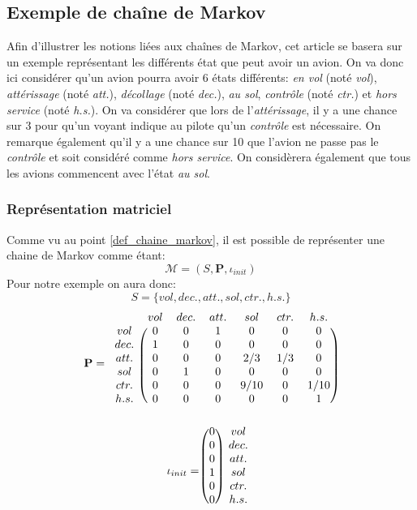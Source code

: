 \documentclass[letterpaper]{article}
\begin{document}
  \subsection{Exemple de chaîne de Markov}
    \label{exemple}
    Afin d'illustrer les notions liées aux chaînes de Markov, cet article se 
    basera sur un exemple représentant les différents état que peut avoir 
    un avion.  On va donc ici considérer qu'un avion pourra avoir 6 états 
    différents: \textit{en vol} (noté \textit{vol}), \textit{attérissage} 
    (noté \textit{att.}), \textit{décollage} (noté \textit{dec.}), 
    \textit{au sol}, \textit{contrôle} (noté \textit{ctr.})
    et \textit{hors service} (noté \textit{h.s.}).
    On va considérer que lors de l'\textit{attérissage}, il y a une chance sur 
    3 pour qu'un voyant indique au pilote qu'un \textit{contrôle} est 
    nécessaire. On remarque également qu'il y a une chance sur 10 que 
    l'avion ne passe pas le \textit{contrôle} et soit considéré comme 
    \textit{hors service}.  On considèrera également que tous les avions commencent
    avec l'état \textit{au sol}.
    
    \subsubsection{Représentation matriciel}
      Comme vu au point \ref{def_chaine_markov}, il est possible de représenter une
      chaine de Markov comme étant:
      $$\mathcal{M} = (S, \mathbf{P}, \iota_{init})$$
      Pour notre exemple on aura donc:
      $$S = \{vol, dec., att., sol, ctr., h.s.\} $$
      $$ \mathbf{P} = 
	\begin{blockarray}{ccccccc}
	& vol & dec. & att. & sol & ctr. & h.s. \\
	  \begin{block}{c(cccccc)}
	    vol  & 0 & 0 & 1 & 0    & 0   & 0    \\
	    dec. & 1 & 0 & 0 & 0    & 0   & 0    \\
	    att. & 0 & 0 & 0 & 2/3  & 1/3 & 0    \\
	    sol  & 0 & 1 & 0 & 0    & 0   & 0    \\
	    ctr. & 0 & 0 & 0 & 9/10 & 0   & 1/10 \\
	    h.s. & 0 & 0 & 0 & 0    & 0   & 1    \\
	  \end{block}
	\end{blockarray}
      $$
      $$\iota_{init} = 
	\begin{blockarray}{cc}
	  \begin{block}{( c ) c}
	    0 & vol \\
	    0 & dec.\\
	    0 & att.\\
	    1 & sol\\
	    0 & ctr.\\
	    0 & h.s.\\
	  \end{block}
	\end{blockarray}
      $$
      
\end{document}
